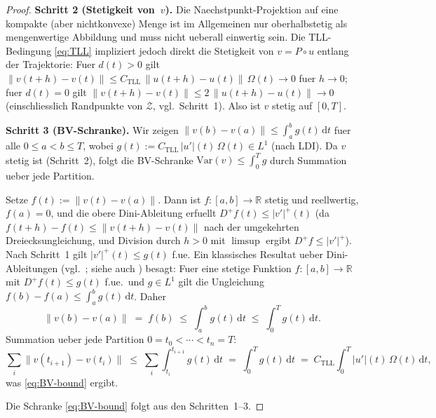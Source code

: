 \documentclass[12pt,a4paper]{article}
\theoremstyle{definition}
\theoremstyle{plain}
\theoremstyle{remark}
\newcommand{\Var}{\mathrm{Var}}
\begin{document}
\begin{proof}
\medskip
\noindent
\textbf{Schritt 2 (Stetigkeit von~$v$).}\;
Die Naechstpunkt-Projektion auf eine kompakte (aber nichtkonvexe)
Menge ist im Allgemeinen nur oberhalbstetig als mengenwertige
Abbildung und muss nicht ueberall einwertig sein.  Die
TLL-Bedingung \eqref{eq:TLL} impliziert jedoch direkt die Stetigkeit
von $v = P \circ u$ entlang der Trajektorie: Fuer $d(t) > 0$ gilt
$\|v(t+h) - v(t)\| \le C_{\mathrm{TLL}}\,\|u(t+h)-u(t)\|\,
\Omega(t) \to 0$ fuer $h \to 0$; fuer $d(t) = 0$ gilt
$\|v(t+h)-v(t)\| \le 2\,\|u(t+h)-u(t)\| \to 0$
(einschliesslich Randpunkte von $\mathcal{Z}$, vgl.\ Schritt~1).
Also ist $v$ stetig auf $[0,T]$.

\medskip
\noindent
\textbf{Schritt 3 (BV-Schranke).}\;
Wir zeigen $\|v(b) - v(a)\| \le \int_a^b g(t)\,\mathrm{d}t$
fuer alle $0 \le a < b \le T$, wobei
$g(t) := C_{\mathrm{TLL}}\,|u'|(t)\,\Omega(t) \in L^1$
(nach LDI).  Da $v$ stetig ist (Schritt~2), folgt die
BV-Schranke $\Var(v) \le \int_0^T g$ durch Summation ueber
jede Partition.

Setze $f(t) := \|v(t) - v(a)\|$.  Dann ist $f: [a,b] \to \mathbb{R}$
stetig und reellwertig,
$f(a) = 0$, und die obere Dini-Ableitung erfuellt
$D^+ f(t) \le |v'|^+(t)$ (da
$f(t+h) - f(t) \le \|v(t+h)-v(t)\|$ nach der umgekehrten
Dreiecksungleichung, und Division durch $h > 0$ mit
$\limsup$ ergibt $D^+ f \le |v'|^+$).
Nach Schritt~1 gilt $|v'|^+(t) \le g(t)$ f.ue.  Ein klassisches Resultat ueber Dini-Ableitungen
(vgl.\ \cite[Kapitel~VII, \S\S\,9--10]{Saks1937}; siehe
auch \cite[Kapitel~3]{AmbrosioFuscoPallara2000}) besagt:
Fuer eine stetige Funktion $f:[a,b] \to \mathbb{R}$ mit
$D^+ f(t) \le g(t)$ f.ue.\ und $g \in L^1$ gilt die
Ungleichung $f(b) - f(a) \le \int_a^b g(t)\,\mathrm{d}t$.
Daher
\[
  \|v(b) - v(a)\| \;=\; f(b)
  \;\le\; \int_a^b g(t)\,\mathrm{d}t
  \;\le\; \int_0^T g(t)\,\mathrm{d}t.
\]
Summation ueber jede Partition $0 = t_0 < \cdots < t_n = T$:
\[
  \sum_i \|v(t_{i+1}) - v(t_i)\|
  \;\le\;
  \sum_i \int_{t_i}^{t_{i+1}} g(t)\,\mathrm{d}t
  \;=\;
  \int_0^T g(t)\,\mathrm{d}t
  \;=\;
  C_{\mathrm{TLL}} \int_0^T |u'|(t)\,\Omega(t)\,\mathrm{d}t,
\]
was \eqref{eq:BV-bound} ergibt.

\medskip
\noindent
Die Schranke \eqref{eq:BV-bound} folgt aus den Schritten~1--3.
\end{proof}
\end{document}
